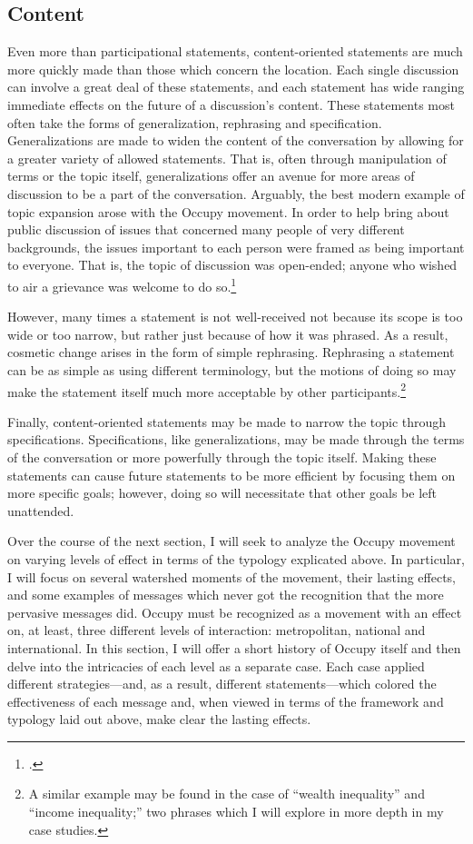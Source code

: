 \documentclass[openany,twoside]{memoir}
\begin{document}
\begin{Spacing}{2}
\subsection{Content}
Even more than participational statements, content-oriented statements are much more quickly made than those which concern the location.
Each single discussion can involve a great deal of these statements, and each statement has wide ranging immediate effects on the future of a discussion's content.
These statements most often take the forms of generalization, rephrasing and specification.
Generalizations are made to widen the content of the conversation by allowing for a greater variety of allowed statements.
That is, often through manipulation of terms or the topic itself, generalizations offer an avenue for more areas of discussion to be a part of the conversation.
Arguably, the best modern example of topic expansion arose with the Occupy movement.
In order to help bring about public discussion of issues that concerned many people of very different backgrounds, the issues important to each person were framed as being important to everyone.
That is, the topic of discussion was open-ended; anyone who wished to air a grievance was welcome to do so.\footcite{graeber11}

However, many times a statement is not well-received not because its scope is too wide or too narrow, but rather just because of how it was phrased.
As a result, cosmetic change arises in the form of simple rephrasing.
Rephrasing a statement can be as simple as using different terminology, but the motions of doing so may make the statement itself much more acceptable by other participants.\footnote{
A similar example may be found in the case of ``wealth inequality'' and ``income inequality;'' two phrases which I will explore in more depth in my case studies.}

Finally, content-oriented statements may be made to narrow the topic through specifications.
Specifications, like generalizations, may be made through the terms of the conversation or more powerfully through the topic itself.
Making these statements can cause future statements to be more efficient by focusing them on more specific goals; however, doing so will necessitate that other goals be left unattended.

Over the course of the next section, I will seek to analyze the Occupy movement on varying levels of effect in terms of the typology explicated above.
In particular, I will focus on several watershed moments of the movement, their lasting effects, and some examples of messages which never got the recognition that the more pervasive messages did.
Occupy must be recognized as a movement with an effect on, at least, three different levels of interaction: metropolitan, national and international.
In this section, I will offer a short history of Occupy itself and then delve into the intricacies of each level as a separate case.
Each case applied different strategies---and, as a result, different statements---which colored the effectiveness of each message and, when viewed in terms of the framework and typology laid out above, make clear the lasting effects.


\end{Spacing}
\end{document}
